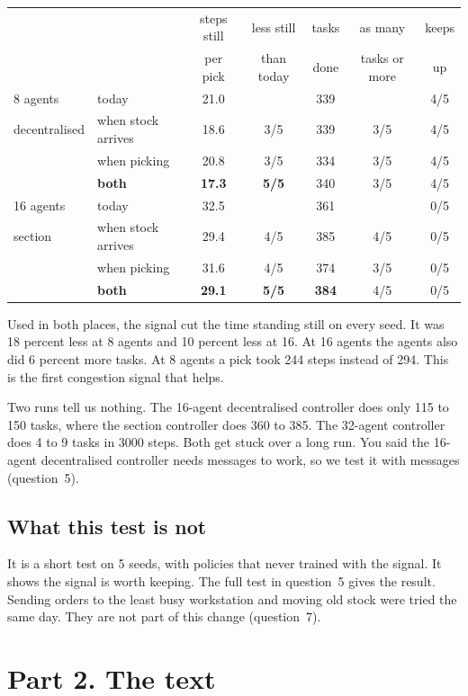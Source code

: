 \documentclass[11pt,a4paper]{article}
\begin{document}
\begin{center}
\begin{tabular}{llccccc}
\toprule
 & & steps still & less still & tasks & as many & keeps \\
 & & per pick & than today & done & tasks or more & up \\
\midrule
8 agents & today & 21.0 & & 339 & & 4/5 \\
decentralised & when stock arrives & 18.6 & 3/5 & 339 & 3/5 & 4/5 \\
 & when picking & 20.8 & 3/5 & 334 & 3/5 & 4/5 \\
 & \textbf{both} & \textbf{17.3} & \textbf{5/5} & 340 & 3/5 & 4/5 \\
\midrule
16 agents & today & 32.5 & & 361 & & 0/5 \\
section & when stock arrives & 29.4 & 4/5 & 385 & 4/5 & 0/5 \\
 & when picking & 31.6 & 4/5 & 374 & 3/5 & 0/5 \\
 & \textbf{both} & \textbf{29.1} & \textbf{5/5} & \textbf{384} & 4/5 & 0/5 \\
\bottomrule
\end{tabular}
\end{center}

Used in both places, the signal cut the time standing still on every seed. It was
18 percent less at 8 agents and 10 percent less at 16. At 16 agents the agents also
did 6 percent more tasks. At 8 agents a pick took 244 steps instead of 294. This is
the first congestion signal that helps.

Two runs tell us nothing. The 16-agent decentralised controller does only 115 to
150 tasks, where the section controller does 360 to 385. The 32-agent controller
does 4 to 9 tasks in 3000 steps. Both get stuck over a long run. You said the
16-agent decentralised controller needs messages to work, so we test it with
messages (question~5).

\subsection*{What this test is not}
It is a short test on 5 seeds, with policies that never trained with the signal. It
shows the signal is worth keeping. The full test in question~5 gives the result.
Sending orders to the least busy workstation and moving old stock were tried the
same day. They are not part of this change (question~7).

\section*{Part 2. The text}
\end{document}
